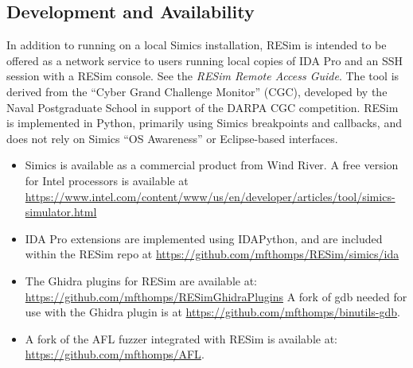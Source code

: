 \documentclass[titlepage]{article}
\begin{document}
\subsection{Development and Availability}
In addition to running on a local Simics installation, RESim is intended to be offered as a network service to users running local copies of IDA Pro and an SSH session with a RESim console.  See the \textit{RESim Remote Access Guide}.  The tool is derived from the “Cyber Grand Challenge Monitor” (CGC), developed by the Naval Postgraduate School in support of the DARPA CGC competition.  
RESim is implemented in Python, primarily using Simics breakpoints and callbacks, and does not rely on 
Simics “OS Awareness” or Eclipse-based interfaces.   
\begin{itemize}
\item Simics is available as a commercial product from Wind River.  A free version for Intel processors is available at
\url{https://www.intel.com/content/www/us/en/developer/articles/tool/simics-simulator.html}

\item IDA Pro extensions are implemented using IDAPython, and are included within the RESim repo at
\url{https://github.com/mfthomps/RESim/simics/ida}  

\item The Ghidra plugins for RESim are available at: \url{https://github.com/mfthomps/RESimGhidraPlugins}  A fork 
of gdb needed for use with the Ghidra plugin is at \url{https://github.com/mfthomps/binutils-gdb}.

\item A fork of the AFL fuzzer integrated with 
RESim is available at: \url{https://github.com/mfthomps/AFL}.
\end{itemize}
\end{document}
